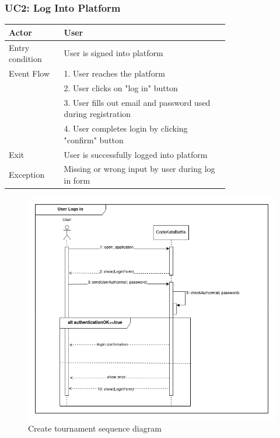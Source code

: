 \subsubsection{UC2: Log Into Platform}
\begin{center}
    \begin{longtable}{lp{0.75\linewidth}}
        \hline
            Actor & User\\
        \hline
            Entry condition & User is signed into platform\\
        \hline
            Event Flow & 1. User reaches the platform\\
                       & 2. User clicks on "log in" button\\
                       & 3. User fills out email and password used during registration\\
                       & 4. User completes login by clicking "confirm" button\\
        \hline
            Exit & User is successfully logged into platform\\
        \hline
            Exception & Missing or wrong input by user during log in form\\
        \hline
    \end{longtable}
\end{center}

\begin{figure}[H]
    \centering
    \includegraphics[width=1\linewidth]{misc//Images//UC Diagrams/UC2.png}
    \caption{Create tournament sequence diagram}
    \label{fig:enter-label}
\end{figure}

